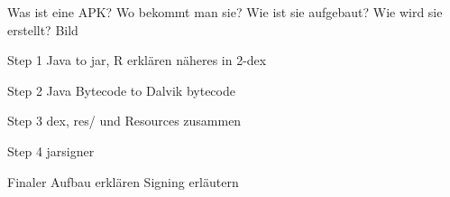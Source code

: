 Was ist eine APK?
Wo bekommt man sie?
Wie ist sie aufgebaut?
Wie wird sie erstellt? Bild

Step 1
Java to jar, R erklären
näheres in 2-dex

Step 2
Java Bytecode to Dalvik bytecode

Step 3
dex, res/ und Resources zusammen

Step 4
jarsigner

Finaler Aufbau erklären
Signing erläutern









